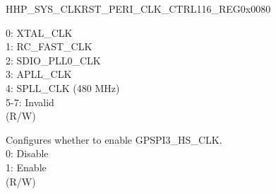 \begin{register}{H}{HP\_SYS\_CLKRST\_PERI\_CLK\_CTRL116\_REG}{0x0080}
\begin{regdesc}
\begin{reglist}
0: XTAL\_CLK\\
1: RC\_FAST\_CLK\\
2: SDIO\_PLL0\_CLK\\
3: APLL\_CLK\\
4: SPLL\_CLK (480 MHz)\\
5-7: Invalid\\ (R/W)
\label{fielddesc:HPSYSCLKRSTGPSPI3HSCLKEN}\item [HP\_SYS\_CLKRST\_GPSPI3\_HS\_CLK\_EN] Configures whether to enable GPSPI3\_HS\_CLK.\\
0: Disable\\
1: Enable\\ (R/W)
\end{reglist}\end{regdesc}
\end{register}


